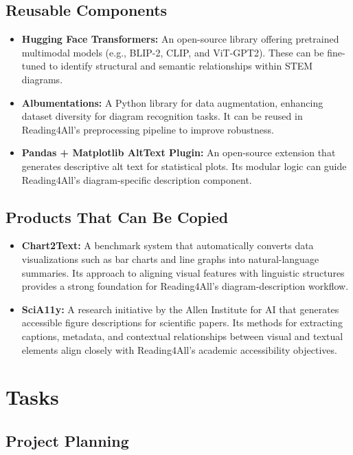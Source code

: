 \documentclass[12pt]{article}
\begin{document}
\subsection{Reusable Components}

\begin{itemize}
    \item \textbf{Hugging Face Transformers:} An open-source library offering pretrained multimodal models (e.g., BLIP-2, CLIP, and ViT-GPT2). These can be fine-tuned to identify structural and semantic relationships within STEM diagrams.

    \item \textbf{Albumentations:} A Python library for data augmentation, enhancing dataset diversity for diagram recognition tasks. It can be reused in Reading4All’s preprocessing pipeline to improve robustness.

    \item \textbf{Pandas + Matplotlib AltText Plugin:} An open-source extension that generates descriptive alt text for statistical plots. Its modular logic can guide Reading4All’s diagram-specific description component.
\end{itemize}

\subsection{Products That Can Be Copied}

\begin{itemize}
    \item \textbf{Chart2Text:} A benchmark system that automatically converts data visualizations such as bar charts and line graphs into natural-language summaries. Its approach to aligning visual features with linguistic structures provides a strong foundation for Reading4All’s diagram-description workflow.

    \item \textbf{SciA11y:} A research initiative by the Allen Institute for AI that generates accessible figure descriptions for scientific papers. Its methods for extracting captions, metadata, and contextual relationships between visual and textual elements align closely with Reading4All’s academic accessibility objectives.
\end{itemize}
\section{Tasks}

\subsection{Project Planning}
\end{document}
